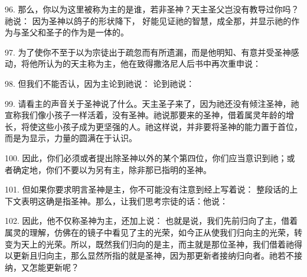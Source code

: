96. 那么，你以为这里被称为主的是谁，若非圣神？天主圣父岂没有教导过你吗？祂说： 因为圣神以鸽子的形状降下， 好能见证祂的智慧，成全那，并显示祂的作为与圣父和圣子的作为是一体的。\par

97. 为了使你不至于以为宗徒出于疏忽而有所遗漏，而是他明知、有意并受圣神感动，将他所认为的天主称为主，他在致得撒洛尼人后书中再次重申说：\par

98. 但我们不能否认，因为主论到祂说： 论到祂说：\par

99. 请看主的声音关于圣神说了什么。天主圣子来了，因为祂还没有倾注圣神，祂宣称我们像小孩子一样活着，没有圣神。祂说那要来的圣神，借着属灵年龄的增长，将使这些小孩子成为更坚强的人。祂这样说，并非要将圣神的能力置于首位，而是为显示，力量的圆满在于认识。\par

100. 因此，你们必须或者提出除圣神以外的某个第四位，你们应当意识到祂；或者确定地，你们不要以为另有主，除非那已指明的圣神。\par

101. 但如果你要求明言圣神是主，你不可能没有注意到经上写着说： 整段话的上下文表明这确是指圣神。那么，让我们思考宗徒的话：他说：\par

102. 因此，他不仅称圣神为主，还加上说： 也就是说，我们先前归向了主，借着属灵的理解，仿佛在的镜子中看见了主的光荣，如今正从使我们归向主的光荣，转变为天上的光荣。所以，既然我们归向的是主，而主就是那位圣神，我们借着祂得以更新且归向主，那么显然所指的就是圣神，因为那更新者接纳归向者。祂若不接纳，又怎能更新呢？\par

